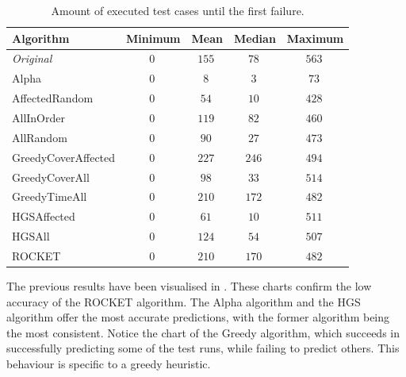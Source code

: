 \begin{table}[h]
	\centering
	\begin{tabularx}{\textwidth}{|X||c|c|c|c|}
		\hline
		\textbf{Algorithm} & \textbf{Minimum} & \textbf{Mean} & \textbf{Median} & \textbf{Maximum}\\
		
		\hline
		
		\emph{Original} & $\SI{0}{}$ & $\SI{155}{}$ & $\SI{78}{}$ & $\SI{563}{}$\\
		
		\hline
		
		Alpha & $\SI{0}{}$ & $\SI{8}{}$ & $\SI{3}{}$ & $\SI{73}{}$\\
		
		\hline
		AffectedRandom & $\SI{0}{}$ & $\SI{54}{}$ & $\SI{10}{}$ & $\SI{428}{}$\\
		AllInOrder & $\SI{0}{}$ & $\SI{119}{}$ & $\SI{82}{}$ & $\SI{460}{}$\\
		AllRandom & $\SI{0}{}$ & $\SI{90}{}$ & $\SI{27}{}$ & $\SI{473}{}$\\
		
		\hline
		
		GreedyCoverAffected & $\SI{0}{}$ & $\SI{227}{}$ & $\SI{246}{}$ & $\SI{494}{}$\\
		GreedyCoverAll & $\SI{0}{}$ & $\SI{98}{}$ & $\SI{33}{}$ & $\SI{514}{}$\\
		GreedyTimeAll & $\SI{0}{}$ & $\SI{210}{}$ & $\SI{172}{}$ & $\SI{482}{}$\\
		
		\hline
		
		HGSAffected & $\SI{0}{}$ & $\SI{61}{}$ & $\SI{10}{}$ & $\SI{511}{}$\\
		HGSAll & $\SI{0}{}$ & $\SI{124}{}$ & $\SI{54}{}$ & $\SI{507}{}$\\
		
		\hline
		
		ROCKET & $\SI{0}{}$ & $\SI{210}{}$ & $\SI{170}{}$ & $\SI{482}{}$\\
		
		\hline
	\end{tabularx}
	\caption{Amount of executed test cases until the first failure.}
	\label{tbl:rq4-first-failure}
\end{table}

\noindent The previous results have been visualised in . These charts confirm the low accuracy of the ROCKET algorithm. The Alpha algorithm and the HGS algorithm offer the most accurate predictions, with the former algorithm being the most consistent. Notice the chart of the Greedy algorithm, which succeeds in successfully predicting some of the test runs, while failing to predict others. This behaviour is specific to a greedy heuristic.\\

